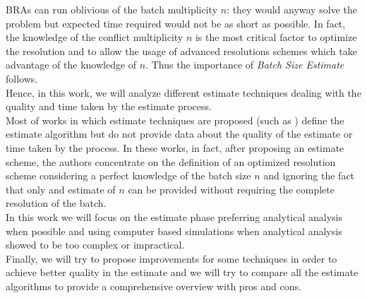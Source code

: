 \documentclass[11pt,a4paper,twoside,openright]{book}
\begin{document}
BRAs can run oblivious of the batch multiplicity $n$: they would anyway solve the problem but expected time required would not be as short as possible. In fact, the knowledge of the conflict multiplicity $n$ is the most critical factor to optimize the resolution and to allow the usage of advanced resolutions schemes which take advantage of the knowledge of $n$. Thus the importance of \emph{Batch Size Estimate} follows.\\

Hence, in this work, we will analyze different estimate techniques dealing with the quality and time taken by the estimate process.\\
Most of works in which estimate techniques are proposed (such as \cite{cidon,greenberg87}) define the estimate  algorithm but do not provide data about the quality of the estimate or time taken by the process. In these works, in fact, after proposing an estimate scheme, the authors concentrate on the definition of an optimized resolution scheme considering a perfect knowledge of the batch size $n$ and ignoring the fact that only and estimate of $n$ can be provided without requiring the complete resolution of the batch.\\
In this work we will focus on the estimate phase preferring analytical analysis when possible and using computer based simulations when analytical analysis showed to be too complex or impractical.\\
Finally, we will try to propose improvements for some techniques in order to achieve better quality in the estimate and we will try to compare all the estimate algorithms to provide a comprehensive overview with pros and cons. 

\end{document}

